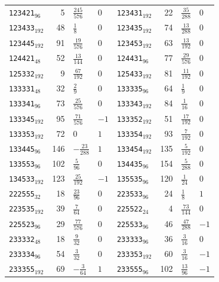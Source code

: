 {\begin{longtable}{@{}lrll@{\hspace{2em}}lrll@{}}
\texttt{123421}$_{96}$ & 5 & $\tfrac{245}{576}$ & 0 & \texttt{123431}$_{192}$ & 22 & $\tfrac{35}{288}$ & 0\\
\texttt{123433}$_{192}$ & 48 & $\tfrac{1}{8}$ & 0 & \texttt{123435}$_{192}$ & 74 & $\tfrac{13}{288}$ & 0\\
\texttt{123445}$_{192}$ & 91 & $\tfrac{19}{576}$ & 0 & \texttt{123453}$_{192}$ & 63 & $\tfrac{13}{192}$ & 0\\
\texttt{124421}$_{48}$ & 52 & $\tfrac{13}{144}$ & 0 & \texttt{124431}$_{96}$ & 77 & $\tfrac{29}{576}$ & 0\\
\texttt{125332}$_{192}$ & 9 & $\tfrac{67}{192}$ & 0 & \texttt{125433}$_{192}$ & 81 & $\tfrac{11}{192}$ & 0\\
\texttt{133331}$_{48}$ & 32 & $\tfrac{2}{9}$ & 0 & \texttt{133335}$_{96}$ & 64 & $\tfrac{1}{9}$ & 0\\
\texttt{133341}$_{96}$ & 73 & $\tfrac{25}{576}$ & 0 & \texttt{133343}$_{192}$ & 84 & $\tfrac{1}{16}$ & 0\\
\texttt{133345}$_{192}$ & 95 & $\tfrac{71}{576}$ & $-1$ & \texttt{133352}$_{192}$ & 51 & $\tfrac{17}{192}$ & 0\\
\texttt{133353}$_{192}$ & 72 & $0$ & $1$ & \texttt{133354}$_{192}$ & 93 & $\tfrac{7}{192}$ & 0\\
\texttt{133445}$_{96}$ & 146 & $-\tfrac{23}{288}$ & $1$ & \texttt{133454}$_{192}$ & 135 & $\tfrac{5}{192}$ & 0\\
\texttt{133553}$_{96}$ & 102 & $\tfrac{5}{96}$ & 0 & \texttt{134435}$_{96}$ & 154 & $\tfrac{5}{288}$ & 0\\
\texttt{134533}$_{192}$ & 123 & $\tfrac{25}{192}$ & $-1$ & \texttt{135535}$_{96}$ & 120 & $\tfrac{1}{24}$ & 0\\
\texttt{222555}$_{32}$ & 18 & $\tfrac{23}{96}$ & 0 & \texttt{223533}$_{96}$ & 24 & $\tfrac{1}{8}$ & $1$\\
\texttt{223535}$_{192}$ & 39 & $\tfrac{7}{64}$ & 0 & \texttt{225522}$_{24}$ & 4 & $\tfrac{73}{144}$ & 0\\
\texttt{225523}$_{96}$ & 29 & $\tfrac{77}{576}$ & 0 & \texttt{225533}$_{96}$ & 46 & $\tfrac{47}{288}$ & $-1$\\
\texttt{233332}$_{48}$ & 18 & $\tfrac{9}{32}$ & 0 & \texttt{233333}$_{96}$ & 36 & $\tfrac{3}{16}$ & 0\\
\texttt{233334}$_{96}$ & 54 & $\tfrac{3}{32}$ & 0 & \texttt{233353}$_{192}$ & 60 & $\tfrac{3}{16}$ & $-1$\\
\texttt{233355}$_{192}$ & 69 & $-\tfrac{3}{64}$ & $1$ & \texttt{233555}$_{96}$ & 102 & $\tfrac{13}{96}$ & $-1$\\

\end{longtable}}

